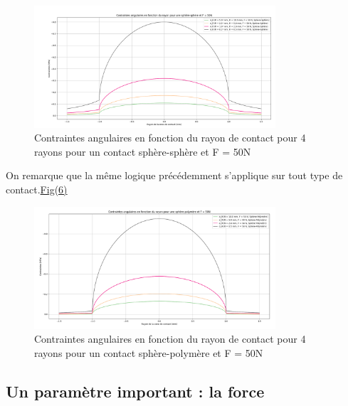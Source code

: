 \documentclass[a4paper,12pt]{article}
\begin{document}
\begin{figure}[H] %
	\centering
	\includegraphics[width=0.8\textwidth]{ang1.png} %
	\caption{Contraintes angulaires en fonction du rayon de contact pour 4 rayons pour un contact sphère-sphère et F = 50N} %
	\label{fig:mon_image5} %
\end{figure}
On remarque que la même logique précédemment s'applique sur tout type de contact.\hyperref[fig:mon_image6]{Fig(6)}
\begin{figure}[H] %
	\centering
	\includegraphics[width=0.8\textwidth]{ang2.png} %
	\caption{Contraintes angulaires en fonction du rayon de contact pour 4 rayons pour un contact sphère-polymère et F = 50N} %
	\label{fig:mon_image6} %
\end{figure}
\clearpage


\subsection{Un paramètre important : la force}
\end{document}
